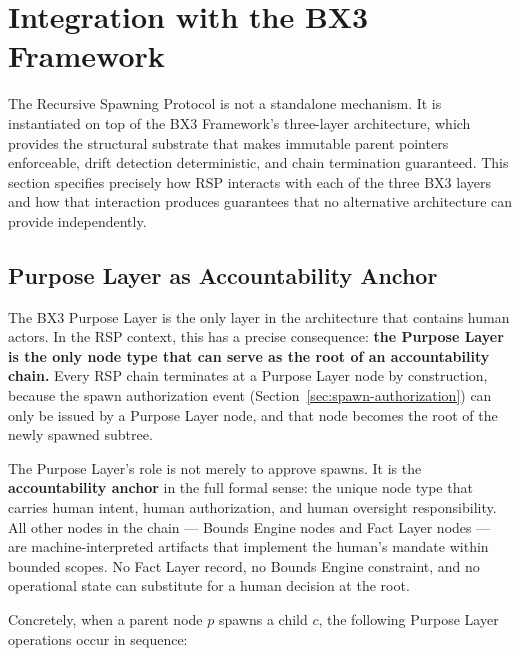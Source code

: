 \section{Integration with the BX3 Framework}
\label{sec:bx3-integration}

The Recursive Spawning Protocol is not a standalone mechanism. It is instantiated on top of the BX3 Framework's three-layer architecture, which provides the structural substrate that makes immutable parent pointers enforceable, drift detection deterministic, and chain termination guaranteed. This section specifies precisely how RSP interacts with each of the three BX3 layers and how that interaction produces guarantees that no alternative architecture can provide independently.


\subsection{Purpose Layer as Accountability Anchor}
\label{sec:purpose-layer-anchor}

The BX3 Purpose Layer is the only layer in the architecture that contains human actors. In the RSP context, this has a precise consequence: \textbf{the Purpose Layer is the only node type that can serve as the root of an accountability chain.} Every RSP chain terminates at a Purpose Layer node by construction, because the spawn authorization event (Section~\ref{sec:spawn-authorization}) can only be issued by a Purpose Layer node, and that node becomes the root of the newly spawned subtree.

The Purpose Layer's role is not merely to approve spawns. It is the \textbf{accountability anchor} in the full formal sense: the unique node type that carries human intent, human authorization, and human oversight responsibility. All other nodes in the chain — Bounds Engine nodes and Fact Layer nodes — are machine-interpreted artifacts that implement the human's mandate within bounded scopes. No Fact Layer record, no Bounds Engine constraint, and no operational state can substitute for a human decision at the root.

Concretely, when a parent node $p$ spawns a child $c$, the following Purpose Layer operations occur in sequence:


